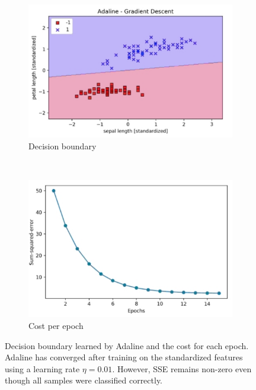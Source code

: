 \documentclass[11pt]{article}
\begin{document}
    \begin{figure}[hbt!]
        \centering
        \begin{subfigure}[t]{.50\textwidth}
            \centering
            \includegraphics[width=\columnwidth,trim=1 1 1 1,clip]{img/ada_2class_dec.png}
            \caption{Decision boundary}
            \label{fig:ada_2class_dec}
        \end{subfigure}
        ~ %
        \begin{subfigure}[t]{.46\textwidth}
            \centering
            \includegraphics[width=\columnwidth,trim=1 1 1 1,clip]{img/ada_2class_cost.png}
            \caption{Cost per epoch}
            \label{fig:ada_2class_cost}
        \end{subfigure}
        \caption{Decision boundary learned by Adaline and the cost for each epoch.
        Adaline has converged after training on the standardized features using a learning rate $\eta=0.01$.
        However, SSE remains non-zero even though all samples were classified correctly.}
        \label{fig:ada_2class}
    \end{figure}
\end{document}
